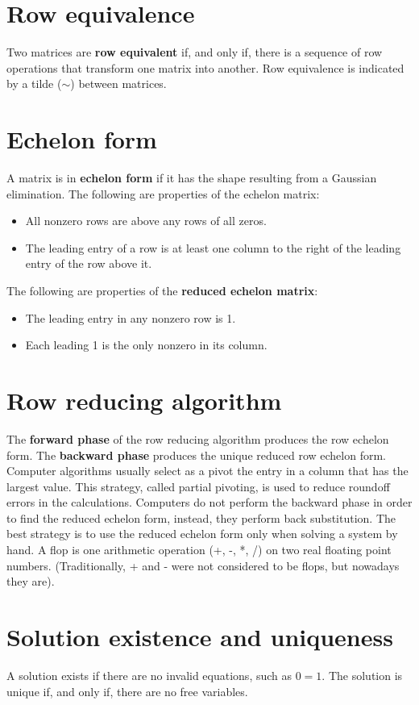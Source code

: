 \documentclass[oneside]{book} %
\theoremstyle{plain}
\begin{document}
\section{Row equivalence}
Two matrices are \textbf{row equivalent} if, and only if, there is a sequence
of row operations that transform one matrix into another.
Row equivalence is indicated by a tilde (\(\sim\)) between matrices.
\section{Echelon form}
A matrix is in \textbf{echelon form} if it has the shape resulting from a
Gaussian
elimination.
The following are properties of the echelon matrix:
\begin{itemize}
\item{All nonzero rows are above any rows of all zeros.}
\item{The leading entry of a row is at least one column to the right of the
leading entry of the row above it.}
\end{itemize}
The following are properties of the \textbf{reduced echelon matrix}:
\begin{itemize}
\item{The leading entry in any nonzero row is 1.}
\item{Each leading 1 is the only nonzero in its column.}
\end{itemize}

\section{Row reducing algorithm}
The \textbf{forward phase} of the row reducing algorithm produces the row
echelon form.
The \textbf{backward phase} produces the unique reduced row echelon form.
Computer algorithms usually select as a pivot the entry in a column that has the
largest value.
This strategy, called partial pivoting, is used to reduce roundoff errors in the
calculations.
Computers do not perform the backward phase in order to find the reduced echelon
form, instead,
they perform back substitution.
The best strategy is to use the reduced echelon form only when solving a system
by hand.
A flop is one arithmetic operation (+, -, *, /) on two real floating point
numbers.
(Traditionally, + and - were not considered to be flops, but nowadays they are).

\section{Solution existence and uniqueness}
A solution exists if there are no invalid equations, such as \( 0 = 1 \). The
solution is unique if, and only if, there are no free variables.
\end{document}
